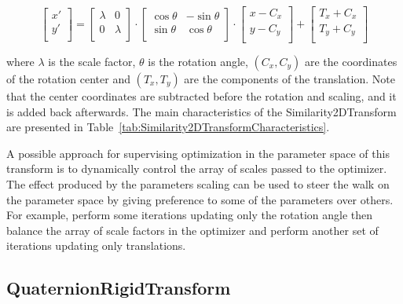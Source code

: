 \begin{equation}
\left[ 
\begin{array}{c}
x' \\
y' \\
\end{array}
\right]
=
\left[ 
\begin{array}{cc}
\lambda &    0     \\
   0    &  \lambda \\
\end{array}
\right]
\cdot
\left[ 
\begin{array}{cc}
\cos{\theta} & -\sin{\theta} \\
\sin{\theta} &  \cos{\theta} \\
\end{array}
\right]
\cdot
\left[ 
\begin{array}{c}
x - C_x \\
y - C_y \\
\end{array}
\right]
+ 
\left[ 
\begin{array}{c}
T_x + C_x \\
T_y + C_y \\
\end{array}
\right]
\end{equation}

where $\lambda$ is the scale factor, $\theta$ is the rotation angle,
$(C_x,C_y)$ are the coordinates of the rotation center and $(T_x,T_y)$ are
the components of the translation. Note that the center coordinates are
subtracted before the rotation and scaling, and it is added back afterwards.
The main characteristics of the Similarity2DTransform are presented in
Table~\ref{tab:Similarity2DTransformCharacteristics}.


A possible approach for supervising optimization in the parameter space of this
transform is to dynamically control the array of scales passed to the
optimizer. The effect produced by the parameters scaling  can be used to steer
the walk on the parameter space by giving preference to some of the parameters
over others. For example, perform some iterations updating only the rotation
angle then balance the array of scale factors in the optimizer and perform
another set of iterations updating only translations. 


\subsection{QuaternionRigidTransform}
\label{sec:QuaternionRigidTransform}

